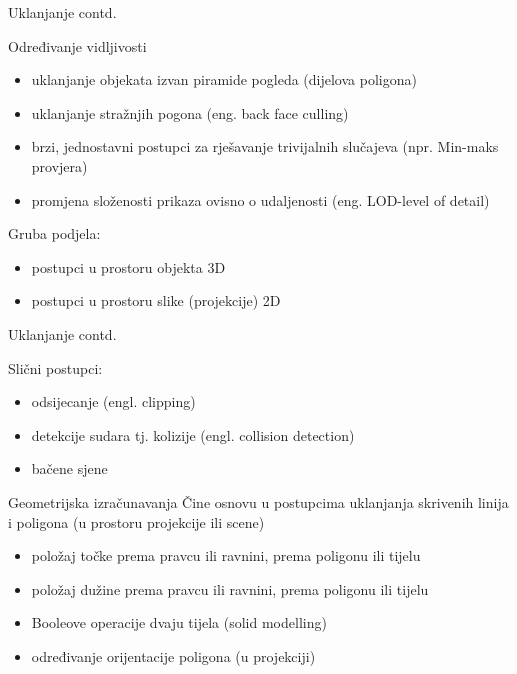 \documentclass[9pt]{beamer}
\begin{document}
\begin{frame}{Uklanjanje contd.}
	\begin{block}{Određivanje vidljivosti}
		\begin{itemize}
			\item uklanjanje objekata izvan piramide pogleda (dijelova poligona)
			\item uklanjanje stražnjih pogona (eng. back face culling)
			\item brzi, jednostavni postupci za rješavanje trivijalnih slučajeva (npr. Min-maks provjera)
			\item promjena složenosti prikaza ovisno o udaljenosti (eng. LOD-level of detail)
		\end{itemize}
	\end{block}
	
	\begin{block}{Gruba podjela:}
		\begin{itemize}
			\item postupci u prostoru objekta 3D
			\item postupci u prostoru slike (projekcije) 2D
		\end{itemize}
	\end{block}
\end{frame}

\begin{frame}{Uklanjanje contd.}
	\begin{block}{Slični postupci:}
		\begin{itemize}
			\item odsijecanje (engl. clipping)
			\item  detekcije sudara tj. kolizije (engl. collision detection)
			\item bačene sjene
		\end{itemize}
	\end{block}
	\begin{block}{Geometrijska izračunavanja}
		Čine osnovu u postupcima uklanjanja skrivenih linija i poligona (u prostoru projekcije ili scene)
		\begin{itemize}
			\item položaj točke prema pravcu ili ravnini, prema poligonu ili tijelu
			\item položaj dužine prema pravcu ili ravnini, prema  poligonu ili tijelu
			\item Booleove operacije dvaju tijela (solid modelling)
			\item određivanje orijentacije poligona (u projekciji)
		\end{itemize}
	\end{block}
\end{frame}
\end{document}
